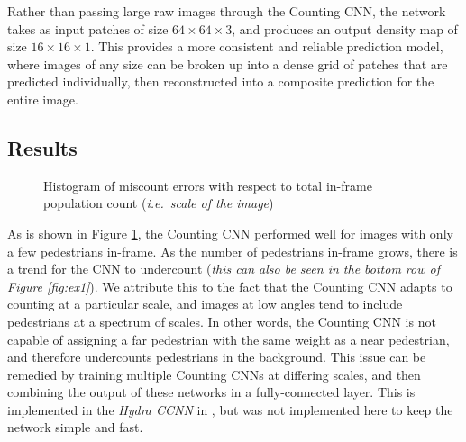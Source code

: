 \documentclass[10pt,twocolumn,letterpaper]{article}
\begin{document}
  Rather than passing large raw images through the Counting CNN, the network
  takes as input patches of size $64 \times 64 \times 3$, and produces an
  output density map of size $16 \times 16 \times 1$. This provides a more
  consistent and reliable prediction model, where images of any size can be
  broken up into a dense grid of patches that are predicted individually, then
  reconstructed into a composite prediction for the entire image.


\subsection{Results}
  \begin{figure}
  \begin{center}
  \end{center}
     \caption{Histogram of miscount errors with respect to total in-frame
     population count (\textit{i.e.\ scale of the image})}
  \label{fig:hist}
  \end{figure}

  As is shown in Figure \ref{fig:hist}, the Counting CNN performed well for
  images with only a few pedestrians in-frame. As the number of pedestrians
  in-frame grows, there is a trend for the CNN to undercount (\textit{this can
  also be seen in the bottom row of Figure \ref{fig:ex1}}). We attribute this
  to the fact that the Counting CNN adapts to counting at a particular scale,
  and images at low angles tend to include pedestrians at a spectrum of scales.
  In other words, the Counting CNN is not capable of assigning a far pedestrian
  with the same weight as a near pedestrian, and therefore undercounts
  pedestrians in the background. This issue can be remedied by training
  multiple Counting CNNs at differing scales, and then combining the output of
  these networks in a fully-connected layer. This is implemented in the
  \textit{Hydra CCNN} in \cite{onoro2016}, but was not implemented here to keep
  the network simple and fast.
\end{document}
